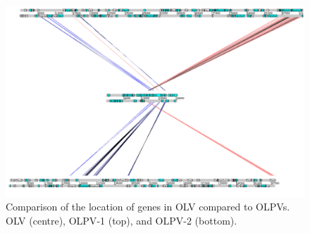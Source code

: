 \begin{figure}
\includegraphics[width=\textwidth]{olv_figures/OLV_OLPV_compare.jpg}
\caption[Genomic comparison of \acs{OLV} and \acs{OLPV}s]{Comparison of the location of genes in \ac{OLV} compared to \acs{OLPV}s. \ac{OLV} (centre), \acs{OLPV}-1 (top), and \acs{OLPV}-2 (bottom).
}
\label{fig:OLV_OLPV_compare}

\end{figure}
